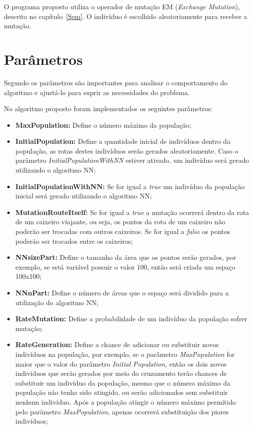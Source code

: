 \documentclass{abnt}
\begin{document}
			O programa proposto utiliza o operador de mutação EM (\textit{Exchange Mutation}), descrito no capítulo~\ref{Sem}. O indivíduo é escolhido aleatoriamente para receber a mutação.
			
						
		\section{Parâmetros}
		
		Segundo  os parâmetros são importantes para analisar o comportamento do algoritmo e ajustá-lo para suprir as necessidades do problema. 
		
		No algoritmo proposto foram implementados os seguintes parâmetros:
		 
			\begin{itemize}
				\item \textbf{MaxPopulation:} Define o número máximo da população; 
				\item \textbf{InitialPopulation:} Define a quantidade inicial de indivíduos dentro da população, as rotas destes indivíduos serão gerados aleatoriamente. Caso o parâmetro \textit{InitialPopulationWithNN} estiver ativado, um indivíduo será gerado utilizando o algoritmo NN;
				\item \textbf{InitialPopulationWithNN:} Se for igual a \textit{true} um indivíduo da população inicial será gerado utilizando o algoritmo NN;
				\item \textbf{MutationRouteItself:} Se for igual a \textit{true} a mutação ocorrerá dentro da rota de um caixeiro viajante, ou seja, os pontos da rota de um caixeiro não poderão ser trocadas com outros caixeiros. Se for igual a \textit{false} os pontos poderão ser trocados entre os caixeiros;
				\item \textbf{NNsizePart:} Define o tamanho da área que os pontos serão gerados, por exemplo, se está variável possuir o valor 100, então será criada um espaço 100x100;
				\item \textbf{NNnPart:} Define o número de áreas que o espaço será dividido para a utilização do algoritmo NN;
				\item \textbf{RateMutation:} Define a probabilidade de um indivíduo da população sofrer mutação;
				\item \textbf{RateGeneration:} Define a chance de adicionar ou substituir novos indivíduos na população, por exemplo, se o parâmetro \textit{MaxPopulation} for maior que o valor do parâmetro \textit{Initial Population}, então os dois novos indivíduos que serão gerados por meio do cruzamento terão chances de substituir um indivíduo da população, mesmo que o número máximo da população não tenha sido atingido, ou serão adicionados sem substituir nenhum indivíduo. Após a população atingir o número máximo permitido pelo parâmetro \textit{MaxPopulation}, apenas ocorrerá substituição dos piores indivíduos;

\end{itemize}
\end{document}

